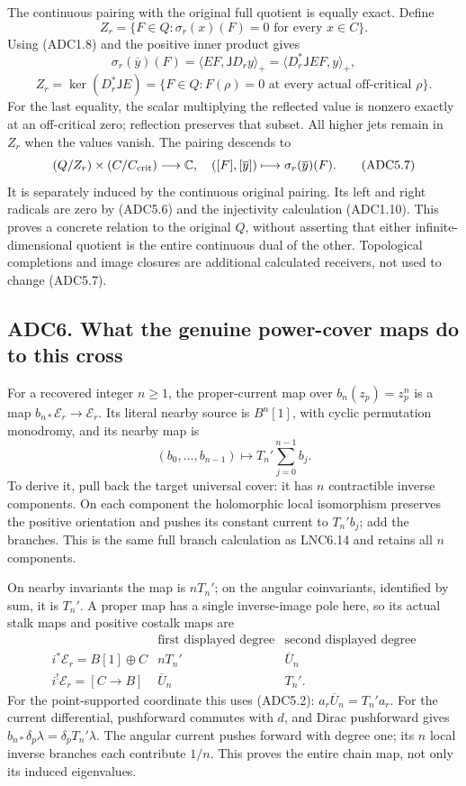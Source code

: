 The continuous pairing with the original full quotient is equally exact.
Define \[
Z_r=\{F\in Q:\sigma_r(x)(F)=0\text{ for every }x\in C\}.
\tag{ADC5.5}
\] Using (ADC1.8) and the positive inner product gives \[
\sigma_r(\overline y)(F)
=\langle EF,\mathsf JD_ry\rangle_+
=\langle D_r^*\mathsf JEF,y\rangle_+,
\] \[
Z_r=\ker(D_r^*\mathsf JE)
=\{F\in Q:F(\rho)=0\text{ at every actual off-critical }\rho\}.
\tag{ADC5.6}
\] For the last equality, the scalar multiplying the reflected value is
nonzero exactly at an off-critical zero; reflection preserves that
subset. All higher jets remain in \(Z_r\) when the values vanish. The
pairing descends to \[
(Q/Z_r)\times(C/C_{\rm crit})\longrightarrow\mathbb C,\quad
([F],[\overline y])\longmapsto\sigma_r(\overline y)(F).
\tag{ADC5.7}
\] It is separately induced by the continuous original pairing. Its left
and right radicals are zero by (ADC5.6) and the injectivity calculation
(ADC1.10). This proves a concrete relation to the original \(Q\),
without asserting that either infinite-dimensional quotient is the
entire continuous dual of the other. Topological completions and image
closures are additional calculated receivers, not used to change
(ADC5.7).

\subsection{ADC6. What the genuine power-cover maps do to this
cross}\label{adc6.-what-the-genuine-power-cover-maps-do-to-this-cross}

For a recovered integer \(n\geq1\), the proper-current map over
\(b_n(z_p)=z_p^n\) is a map \(b_{n*}\mathscr E_r\to\mathscr E_r\). Its
literal nearby source is \(B^n[1]\), with cyclic permutation monodromy,
and its nearby map is \[
(b_0,\ldots,b_{n-1})\longmapsto T_n'\sum_{j=0}^{n-1}b_j.
\tag{ADC6.1}
\] To derive it, pull back the target universal cover: it has \(n\)
contractible inverse components. On each component the holomorphic local
isomorphism preserves the positive orientation and pushes its constant
current to \(T_n'b_j\); add the branches. This is the same full branch
calculation as LNC6.14 and retains all \(n\) components.

On nearby invariants the map is \(nT_n'\); on the angular coinvariants,
identified by sum, it is \(T_n'\). A proper map has a single
inverse-image pole here, so its actual stalk maps and positive costalk
maps are \[
\begin{array}{c|cc}
&\text{first displayed degree}&\text{second displayed degree}\\ \hline
i^*\mathscr E_r=B[1]\oplus C&nT_n'&\overline U_n\\
i^!\mathscr E_r=[C\to B]&\overline U_n&T_n'.
\end{array}
\tag{ADC6.2}
\] For the point-supported coordinate this uses (ADC5.2):
\(a_r\overline U_n=T_n'a_r\). For the current differential, pushforward
commutes with \(d\), and Dirac pushforward gives
\(b_{n*}\delta_p\lambda=\delta_pT_n'\lambda\). The angular current
pushes forward with degree one; its \(n\) local inverse branches each
contribute \(1/n\). This proves the entire chain map, not only its
induced eigenvalues.

